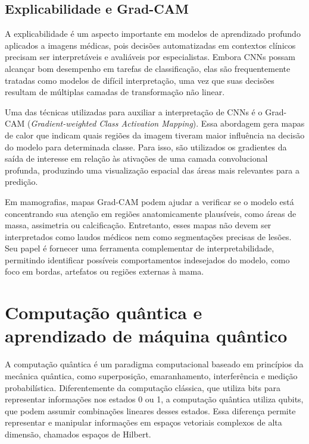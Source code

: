 \documentclass[
    12pt,
    openright,
    oneside,
    a4paper,
    english,
    brazil
]{abntex2}
\begin{document}
\subsection{Explicabilidade e Grad-CAM}

A explicabilidade é um aspecto importante em modelos de aprendizado profundo aplicados a imagens médicas, pois decisões automatizadas em contextos clínicos precisam ser interpretáveis e avaliáveis por especialistas. Embora CNNs possam alcançar bom desempenho em tarefas de classificação, elas são frequentemente tratadas como modelos de difícil interpretação, uma vez que suas decisões resultam de múltiplas camadas de transformação não linear.

Uma das técnicas utilizadas para auxiliar a interpretação de CNNs é o Grad-CAM (\textit{Gradient-weighted Class Activation Mapping}). Essa abordagem gera mapas de calor que indicam quais regiões da imagem tiveram maior influência na decisão do modelo para determinada classe. Para isso, são utilizados os gradientes da saída de interesse em relação às ativações de uma camada convolucional profunda, produzindo uma visualização espacial das áreas mais relevantes para a predição.


Em mamografias, mapas Grad-CAM podem ajudar a verificar se o modelo está concentrando sua atenção em regiões anatomicamente plausíveis, como áreas de massa, assimetria ou calcificação. Entretanto, esses mapas não devem ser interpretados como laudos médicos nem como segmentações precisas de lesões. Seu papel é fornecer uma ferramenta complementar de interpretabilidade, permitindo identificar possíveis comportamentos indesejados do modelo, como foco em bordas, artefatos ou regiões externas à mama.

\section{Computação quântica e aprendizado de máquina quântico}

A computação quântica é um paradigma computacional baseado em princípios da mecânica quântica, como superposição, emaranhamento, interferência e medição probabilística. Diferentemente da computação clássica, que utiliza bits para representar informações nos estados 0 ou 1, a computação quântica utiliza qubits, que podem assumir combinações lineares desses estados. Essa diferença permite representar e manipular informações em espaços vetoriais complexos de alta dimensão, chamados espaços de Hilbert.
\end{document}
